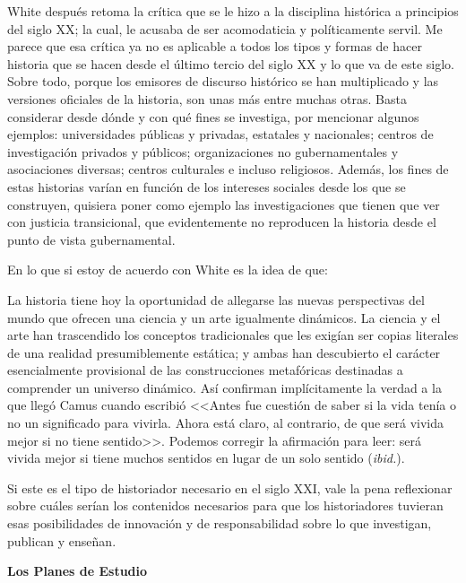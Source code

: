 White después retoma la crítica que se le hizo a la disciplina 
histórica a principios del siglo XX; la cual, le acusaba de ser 
acomodaticia y políticamente servil. Me parece que esa crítica ya no es 
aplicable a todos los tipos y formas de hacer historia que se hacen 
desde el último tercio del siglo XX y lo que va de este siglo. Sobre 
todo, porque los emisores de discurso histórico se han multiplicado y 
las versiones oficiales de la historia, son unas más entre muchas 
otras. Basta considerar desde dónde y con qué fines se investiga, por 
mencionar algunos ejemplos: universidades públicas y privadas, 
estatales y nacionales; centros de investigación privados y públicos; 
organizaciones no gubernamentales y asociaciones diversas; centros 
culturales e incluso religiosos. Además, los fines de estas historias 
varían en función de los intereses sociales desde los que se 
construyen, quisiera poner como ejemplo las investigaciones que tienen 
que ver con justicia transicional, que evidentemente no reproducen la 
historia desde el punto de vista gubernamental. 

\enlargethispage{1\baselineskip}
En lo que si estoy de acuerdo con White es la idea de que:

La historia tiene hoy la oportunidad de allegarse las nuevas 
perspectivas del mundo que ofrecen una ciencia y un arte igualmente 
dinámicos. La ciencia y el arte han trascendido los conceptos 
tradicionales que les exigían ser copias literales de una realidad 
presumiblemente estática; y ambas han descubierto el carácter 
esencialmente provisional de las construcciones metafóricas destinadas 
a comprender un universo dinámico. Así confirman implícitamente la 
verdad a la que llegó Camus cuando escribió <<Antes fue cuestión de 
saber si la vida tenía o no un significado para vivirla. Ahora está 
claro, al contrario, de que será vivida mejor si no tiene sentido>>. 
Podemos corregir la afirmación para leer: será vivida mejor si tiene 
muchos sentidos en lugar de un solo sentido (\textit{ibid.}).
\newpage

Si este es el tipo de historiador necesario en el siglo XXI, 
vale la pena reflexionar sobre cuáles serían los contenidos necesarios 
para que los historiadores tuvieran esas posibilidades de innovación y 
de responsabilidad sobre lo que investigan, publican y enseñan. 

\medskip
\textbf{Los Planes de Estudio}

